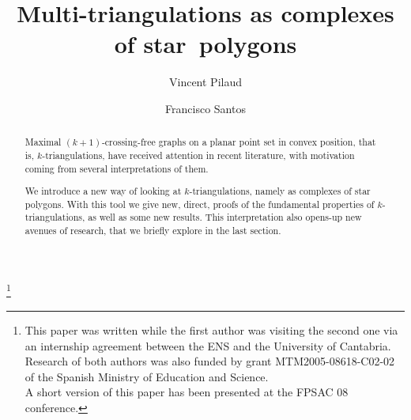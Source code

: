 \documentclass[12pt]{amsart}
\begin{document}
 

\newtheorem{theorem}{Theorem}[section]
\newtheorem{proposition}[theorem]{Proposition}
\newtheorem{lemma}[theorem]{Lemma}
\newtheorem{corollary}[theorem]{Corollary}
\newtheorem{definition}[theorem]{Definition}
\newtheorem{conjecture}[theorem]{Conjecture}
\newtheorem{example}[theorem]{Example}
\newtheorem{remark}[theorem]{Remark}


\newcommand{\cl}{\ensuremath{\prec}}
\newcommand{\cle}{\ensuremath{\preccurlyeq}}

\makeatletter
\newlength{\earraycolsep}
\setlength{\earraycolsep}{2pt}
\def\eqnarray{\stepcounter{equation}\let\@currentlabel%
\theequation
\global\@eqnswtrue\m@th
\global\@eqcnt\z@\tabskip\@centering\let\\\@eqncr
$$\halign to\displaywidth\bgroup\@eqnsel\hskip\@centering
$\displaystyle\tabskip\z@{##}$&\global\@eqcnt\@ne
\hskip 2\earraycolsep \hfil$\displaystyle{##}$\hfil
&\global\@eqcnt\tw@ \hskip 2\earraycolsep
$\displaystyle\tabskip\z@{##}$\hfil
\tabskip\@centering&\llap{##}\tabskip\z@\cr}
\makeatother

\title{Multi-triangulations as complexes of star~polygons}
\author{Vincent Pilaud \and Francisco Santos}

\thanks{This paper was written while the first author was visiting the second one via an internship agreement between the ENS and the University of Cantabria. Research of both authors was also funded by grant MTM2005-08618-C02-02 of the Spanish Ministry of Education and Science.
\\
\indent A short version of this paper has been presented at the FPSAC 08 conference.}
\maketitle

\begin{abstract}
Maximal $(k+1)$-crossing-free graphs on a planar point set in convex position, that is, $k$-triangulations, have received attention in recent literature, with motivation coming from several interpretations of them.

We introduce a new way of looking at $k$-triangulations, namely as complexes of star polygons.
With this tool we give new, direct, proofs of the fundamental properties of $k$-triangulations, as well as some new results.
%
This interpretation also opens-up new avenues of research, that we briefly explore in the last section.
\end{abstract}
\end{document}
